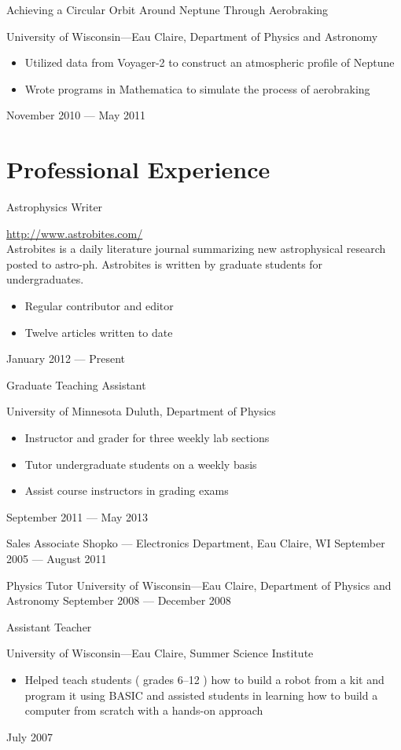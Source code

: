 \documentclass{cv}
\begin{document}
\begin{resume}
\objectLarge
{Achieving a Circular Orbit Around Neptune}
{Through Aerobraking}
{University of Wisconsin---Eau Claire, Department of Physics and Astronomy \noemph
\begin{itemize}
		\item Utilized data from Voyager-2 to construct an atmospheric profile of Neptune
		\item Wrote programs in Mathematica to simulate the process of aerobraking
	\end{itemize}
 }
{November 2010 --- May 2011}



\section{Professional Experience}



\object
{Astrophysics Writer}
{\rm \href{http://astrobites.com/}{http://www.astrobites.com/} \noemph \\
Astrobites is a daily literature journal summarizing new astrophysical research posted to astro-ph. Astrobites is written by graduate students for 	undergraduates.
	\begin{itemize}
		\item Regular contributor and editor
		\item Twelve articles written to date 
	\end{itemize}
 }
{January 2012 --- Present}


\object
{Graduate Teaching Assistant}
{University of Minnesota Duluth, Department of Physics \noemph
\begin{itemize}
		\item Instructor and grader for three weekly lab sections
		\item Tutor undergraduate students on a weekly basis
		\item Assist course instructors in grading exams
	\end{itemize}
 }
{September 2011 --- May 2013}


\object
{Sales Associate}
{Shopko --- Electronics Department, Eau Claire, WI}
{September 2005 --- August 2011}


\object
{Physics Tutor}
{University of Wisconsin---Eau Claire, Department of Physics and Astronomy}
{September 2008 --- December 2008}


\object
{Assistant Teacher}
{University of Wisconsin---Eau Claire, Summer Science Institute \noemph
\begin{itemize}
		\item Helped teach students ( grades 6--12 ) how to build a robot from a kit and program it using BASIC and assisted students in learning how to build a computer from scratch with a hands-on approach
	\end{itemize}
 }
{July 2007}



\end{resume}
\end{document}
